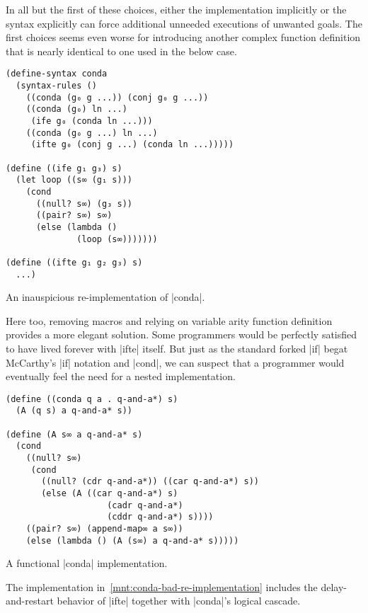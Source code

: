 \documentclass[sigplan,screen,draft,anonymous,review,natbib=false]{acmart}
\begin{document}
In all but the first of these choices, either the implementation
implicitly or the syntax explicitly can force additional unneeded
executions of unwanted goals. The first choices seems even worse for
introducing another complex function definition that is nearly
identical to one used in the below case.

\begin{listing}
  \begin{verbatim}
(define-syntax conda
  (syntax-rules ()
    ((conda (g₀ g ...)) (conj g₀ g ...))
    ((conda (g₀) ln ...)
     (ife g₀ (conda ln ...)))
    ((conda (g₀ g ...) ln ...)
     (ifte g₀ (conj g ...) (conda ln ...)))))

(define ((ife g₁ g₃) s)
  (let loop ((s∞ (g₁ s)))
    (cond
      ((null? s∞) (g₃ s))
      ((pair? s∞) s∞)
      (else (lambda ()
              (loop (s∞)))))))

(define ((ifte g₁ g₂ g₃) s)
  ...)
  \end{verbatim}
  \caption{An inauspicious re-implementation of \rackinline|conda|.}
  \label{mnt:conda-bad-re-implementation}
\end{listing}

Here too, removing macros and relying on variable arity function
definition provides a more elegant solution. Some programmers would be
perfectly satisfied to have lived forever with \rackinline|ifte|
itself. But just as the standard forked \rackinline|if| begat
McCarthy's \rackinline|if| notation and \rackinline|cond|, we can
suspect that a programmer would eventually feel the need for a nested
implementation.

\begin{listing}
  \begin{verbatim}
(define ((conda q a . q-and-a*) s)
  (A (q s) a q-and-a* s))

(define (A s∞ a q-and-a* s)
  (cond
    ((null? s∞)
     (cond
       ((null? (cdr q-and-a*)) ((car q-and-a*) s))
       (else (A ((car q-and-a*) s)
                    (cadr q-and-a*)
                    (cddr q-and-a*) s))))
    ((pair? s∞) (append-map∞ a s∞))
    (else (lambda () (A (s∞) a q-and-a* s)))))
  \end{verbatim}
  \caption{A functional \rackinline|conda| implementation.}
  \label{mnt:conda-good-re-implementation}
\end{listing}

The implementation in~\cref{mnt:conda-bad-re-implementation} includes
the delay-and-restart behavior of \rackinline|ifte| together with
\rackinline|conda|'s logical cascade.
\end{document}
